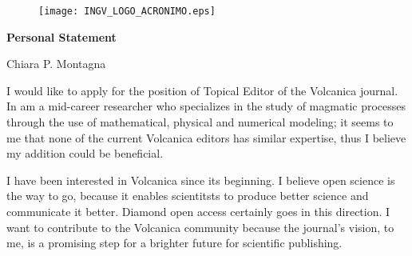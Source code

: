 \documentclass{report}
\begin{document}
\begin{figure}[h]
  \texttt{[image: INGV\_LOGO\_ACRONIMO.eps]}
\end{figure}

\begin{center}
    \Huge \textbf{Personal Statement} 
    \par
    \vspace{2mm}
    \Large Chiara P. Montagna
\end{center}

\par
\vspace{1 cm}



I would like to apply for the position of Topical Editor of the Volcanica journal. In am a mid-career researcher who specializes in the study of magmatic processes through the use of mathematical, physical and numerical modeling; it seems to me that none of the current Volcanica editors has similar expertise, thus I believe my addition could be beneficial. 

I have been interested in Volcanica since its beginning. I believe open science is the way to go, because it enables scientitsts to produce better science and communicate it better. Diamond open access certainly goes in this direction. I want to contribute to the Volcanica community because the journal's vision, to me, is a promising step for a brighter future for scientific publishing. 
\end{document}
